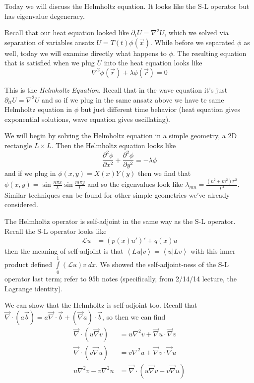 \documentclass[10pt]{report}
\newcommand{\ptd}[2]{\frac{\partial^2 #1}{\partial#2^2}}
\newcommand{\dotp}[2]{\left<#1\left.\right|#2\right>}
\begin{document}
Today we will discuss the Helmholtz equation. It looks like the S-L operator but has eigenvalue degeneracy. 

Recall that our heat equation looked like $\partial_t U = \nabla^2 U$, which we solved via separation of variables ansatz $U = T(t) \phi(\vec{x})$. While before we separated $\phi$ as well, today we will examine directly what happens to $\phi$. The resulting equation that is satisfied when we plug $U$ into the heat equation looks like
\begin{equation}
    \nabla^2 \phi(\vec{r}) + \lambda \phi(\vec{r}) = 0
\end{equation}

This is the \emph{Helmholtz Equation}. Recall that in the wave equation it's just $\partial_{tt} U = \nabla^2 U$ and so if we plug in the same ansatz above we have te same Helmholtz equation in $\phi$ but just different time behavior (heat equation gives exponential solutions, wave equation gives oscillating). 

We will begin by solving the Helmholtz equation in a simple geometry, a 2D rectangle $L\times L$. Then the Helmholtz equation looks like
\begin{equation}
    \ptd{\phi}{x} + \ptd{\phi}{y} = -\lambda \phi
\end{equation}
and if we plug in $\phi(x,y) = X(x)Y(y)$ then we find that $\phi(x,y) = \sin \frac{n\pi x}{L}\sin \frac{m\pi y}{L}$ and so the eigenvalues look like $\lambda_{mn} = \frac{(n^2 + m^2) \pi^2}{L^2}$. Similar techniques can be found for other simple geometries we've already considered.

The Helmholtz operator is self-adjoint in the same way as the S-L operator. Recall the S-L operator looks like
\begin{align}
    \mathcal{L}u &= \left( p(x) u' \right)' + q(x)u
\end{align}
then the meaning of self-adjoint is that $\dotp{Lu}{v} = \dotp{u}{Lv}$ with this inner product defined $\int\limits_{0}^{1}(\mathcal{L}u) v\;dx$. We showed the self-adjoint-ness of the S-L operator last term; refer to 95b notes (specifically, from 2/14/14 lecture, the Lagrange identity). 

We can show that the Helmholtz is self-adjoint too. Recall that $\vec{\nabla} \cdot \left( a\vec{b} \right) = a\vec{\nabla} \cdot \vec{b} + (\vec{\nabla}a) \cdot \vec{b}$, so then we can find
\begin{align}
    \vec{\nabla} \cdot (u \vec{\nabla} v) &= u \nabla^2 v + \vec{\nabla} u \cdot \vec{\nabla}v\\
    \vec{\nabla} \cdot (v \vec{\nabla} u) &= v \nabla^2 u + \vec{\nabla} v \cdot \vec{\nabla}u\\
    u \nabla^2 v - v\nabla^2 u &= \vec{\nabla} \cdot \left( u \vec{\nabla} v - v \vec{\nabla}u \right)
\end{align}
\end{document}
